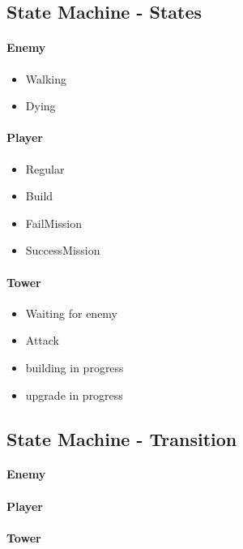 \documentclass[12pt]{article}
\begin{document}
\subsection{State Machine - States}
\paragraph{Enemy}
\begin{itemize}
	\item Walking
	\item Dying
\end{itemize}

\paragraph{Player}
\begin{itemize}
	\item Regular
	\item Build
	\item FailMission
	\item SuccessMission
\end{itemize}

\paragraph{Tower}
\begin{itemize}
	\item Waiting for enemy
	\item Attack
	\item building in progress
	\item upgrade in progress
\end{itemize}

\subsection{State Machine - Transition}
\paragraph{Enemy}
\paragraph{Player}
\paragraph{Tower}
\end{document}
